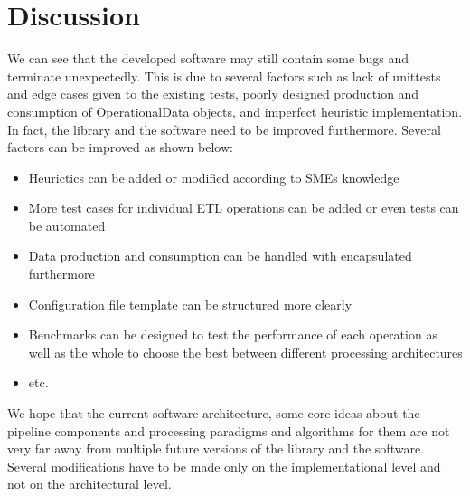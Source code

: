 \section{Discussion}

We can see that the developed software may still contain some bugs and terminate unexpectedly. This 
is due to several factors such as lack of unittests and edge cases given to the existing tests, 
poorly designed production and consumption of OperationalData objects, and imperfect heuristic 
implementation. In fact, the library and the software need to be improved furthermore. Several 
factors can be improved as shown below:

\begin{itemize}
	\item Heurictics can be added or modified according to SMEs knowledge
	\item More test cases for individual ETL operations can be added or even tests can be automated
	\item Data production and consumption can be handled with encapsulated furthermore
	\item Configuration file template can be structured more clearly
	\item Benchmarks can be designed to test the performance of each operation as well as the whole 
		to choose the best between different processing architectures
	\item etc.
\end{itemize}

We hope that the current software architecture, some core ideas about the pipeline components and 
processing paradigms and algorithms for them are not very far away from multiple future versions 
of the library and the software. Several modifications have to be made only on the implementational 
level and not on the architectural level.
